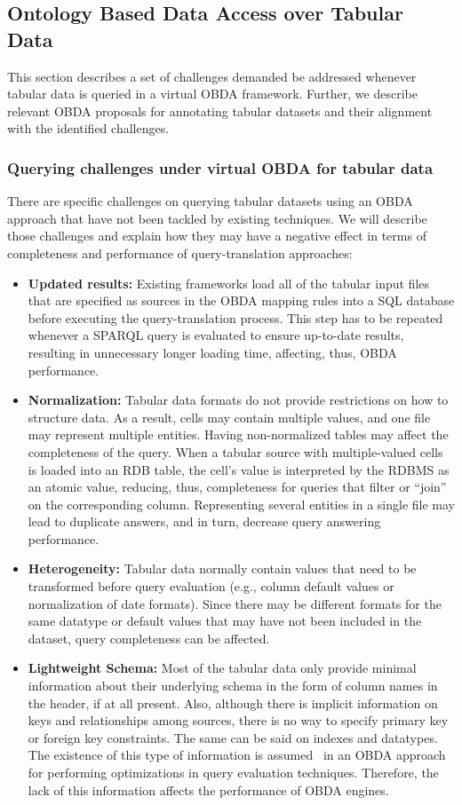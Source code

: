 \subsection{Ontology Based Data Access over Tabular Data}
This section describes a set of challenges demanded be addressed whenever tabular data is queried in a virtual OBDA framework. Further, we describe relevant OBDA proposals for annotating tabular datasets and their alignment with the identified challenges.

\subsubsection{Querying challenges under virtual OBDA for tabular data}
There are specific challenges on querying tabular datasets using an OBDA approach that have not been tackled by existing techniques. We will describe those challenges and explain how they may have a negative effect in terms of completeness and performance of query-translation approaches:
\begin{itemize}
    \item \textbf{Updated results:} Existing frameworks load all of the tabular input files that are specified as sources in the OBDA mapping rules into a SQL database before executing the query-translation process. This step has to be repeated whenever a SPARQL query is evaluated to ensure up-to-date results, resulting in unnecessary longer loading time, affecting, thus, OBDA performance.
    \item \textbf{Normalization:} Tabular data formats do not provide restrictions on how to structure data. As a result, cells may contain multiple values, and one file may represent multiple entities. Having non-normalized tables may affect the completeness of the query. When a tabular source with multiple-valued cells is loaded into an RDB table, the cell's value is interpreted by the RDBMS as an atomic value, reducing, thus, completeness for queries that filter or ``join'' on the corresponding column. Representing several entities in a single file may lead to duplicate answers, and in turn, decrease query answering performance.
    \item\textbf{Heterogeneity:} Tabular data normally contain values that need to be transformed before query evaluation (e.g., column default values or normalization of date formats). Since there may be different formats for the same datatype or default values that may have not been included in the dataset, query completeness can be affected.
    \item \textbf{Lightweight Schema:} Most of the tabular data only provide minimal information about their underlying schema in the form of column names in the header, if at all present. Also, although there is implicit information on keys and relationships among sources, there is no way to specify primary key or foreign key constraints. The same can be said on indexes and datatypes. The existence of this type of information is assumed~\citep{xiao2018obdasurvey} in an OBDA approach for performing optimizations in query evaluation techniques. Therefore, the lack of this information affects the performance of OBDA engines.
\end{itemize}


